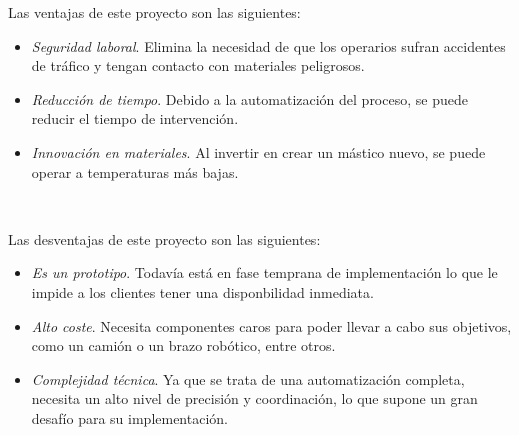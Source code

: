 Las ventajas de este proyecto son las siguientes:

\begin{itemize}
	\item \textit{Seguridad laboral}. Elimina la necesidad de que los operarios sufran accidentes de tráfico y tengan contacto con materiales peligrosos.
	\item \textit{Reducción de tiempo}. Debido a la automatización del proceso, se puede reducir el tiempo de intervención.
	\item \textit{Innovación en materiales}. Al invertir en crear un mástico nuevo, se puede operar a temperaturas más bajas.
\end{itemize}\


Las desventajas de este proyecto son las siguientes:

\begin{itemize}
	\item \textit{Es un prototipo}. Todavía está en fase temprana de implementación lo que le impide a los clientes tener una disponbilidad inmediata.
	\item \textit{Alto coste}. Necesita componentes caros para poder llevar a cabo sus objetivos, como un camión o un brazo robótico, entre otros.
	\item \textit{Complejidad técnica}. Ya que se trata de una automatización completa, necesita un alto nivel de precisión y coordinación, lo que supone un gran desafío para su implementación.
\end{itemize}\



